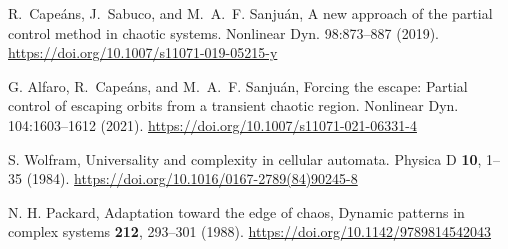 \begin{thebibliography}{01}
R.~Cape{\'a}ns, J.~Sabuco, and M.~A.~F. Sanju{\'a}n, 
A new approach of the partial control method in chaotic systems.
Nonlinear Dyn. 98:873--887
(2019).
\url{https://doi.org/10.1007/s11071-019-05215-y}

G. Alfaro, R.~Cape{\'a}ns, and M.~A.~F. Sanju{\'a}n, 
Forcing the escape: Partial control of escaping orbits from a
transient chaotic region.
Nonlinear Dyn. 104:1603–1612
(2021). 
\url{https://doi.org/10.1007/s11071-021-06331-4}



\raggedright
S. Wolfram,
Universality and complexity in cellular automata.
Physica D \textbf{10}, 1--35 (1984).
\url{https://doi.org/10.1016/0167-2789(84)90245-8}


N. H. Packard,
Adaptation toward the edge of chaos,
Dynamic patterns in complex systems \textbf{212}, 293--301
(1988).
\url{https://doi.org/10.1142/9789814542043}



\end{thebibliography}

